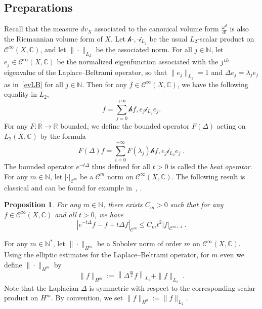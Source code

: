 \documentclass[11pt]{article}
\newtheorem{prop}[theo]{Proposition}
\theoremstyle{definition}
\numberwithin{equation}{section}
\numberwithin{figure}{section}
\numberwithin{table}{section}
\newcommand{\R}{{\mathbb{R}}}
\newcommand{\N}{{\mathbb{N}}}
\newcommand{\CCC}{{\mathbb{C}}}
\newcommand{\CC}{\mathcal{C}}
\newcommand{\om}{{\omega}}
\renewcommand\leq {\leqslant}
\newcommand\< {\mathcal{h}}
\renewcommand\> {\mathcal{i}}
\newcommand{\cinf}{\CC^\infty}
\newcommand*\cC{\mathscr{C}}
\newcommand\fl {\rightarrow}
\newcommand*{\MK}{\mkern 2mu}
\begin{document}
\subsection{Preparations}\label{subsecprep}

Recall that the measure $dv_X$ associated to the canonical volume form $\frac{\om^d}{d!}$ is also the Riemannian volume form of $X$. Let $\<\cdot,\cdot\>_{L_2}$ be the usual $L_2$-scalar product on $\cinf(X,\CCC)$, and let $\|\cdot\|_{L_2}$ be the associated norm. For all $j\in\N$, let $e_j\in\cinf(X,\CCC)$ be the normalized eigenfunction associated with the $j^{\rm th}$ eigenvalue of the Laplace--Beltrami operator, so that $\|e_j\|_{L_2}=1$ and $\Delta e_j=\lambda_j e_j$ as in~\eqref{evLB} for all $j\in\N$. Then for any $f\in\cinf(X,\CCC)$, we have the following equality in $L_2$,
\begin{equation}
f=\sum_{j=0}^{+\infty}\<f,e_j\>_{L_2}e_j.
\end{equation}
For any $F:\R\fl\R$ bounded, we define the bounded operator $F(\Delta)$ acting on $L_2(X,\CCC)$ by the formula
\begin{equation}\label{calculfct}
F(\Delta)f=\sum_{i=0}^{+\infty} F(\lambda_j)\<f,e_j\>_{L_2}e_j\;.
\end{equation}
The bounded operator $e^{-t\Delta}$ thus defined for all $t>0$ is called the \emph{heat operator}. For any $m\in\N$, let $|\cdot|_{\cC^m}$ be a $\cC^m$ norm on $\cinf(X,\CCC)$. The following result is classical and can be found for example in~\cite{Kannai}, \cite[Theorem~2.29$\MK$(2.8)]{BGV04}.

\begin{prop}\label{heatexpprop}
For any $m\in\N$, there exists $C_m>0$ such that for any $f\in\cinf(X,\CCC)$ and all $t>0$, we have
\begin{equation}\label{heatexpfla}
\left|e^{-t\Delta}f-f+t\Delta f\right|_{\cC^m}\leq C_m t^2 |f|_{\cC^{m+4}}\;.
\end{equation}
\end{prop}

For any $m\in\N^*$, let $\|\cdot\|_{H^m}$ be a Sobolev norm of order $m$ on $\cinf(X,\CCC)$. Using the elliptic estimates for the Laplace--Beltrami operator, for $m$ even we define $\|\cdot\|_{H^m}$ by
\begin{equation}\label{ellest}
\|f\|_{H^m} := \left\|\Delta^{\frac{m}{2}}f\right\|_{L_2} + \|f\|_{L_2}\;.
\end{equation}
Note that the Laplacian $\Delta$ is symmetric with respect to the corresponding scalar product on $H^m$. By convention, we set $\|f\|_{H^0}:=\|f\|_{L_2}$.
\end{document}
